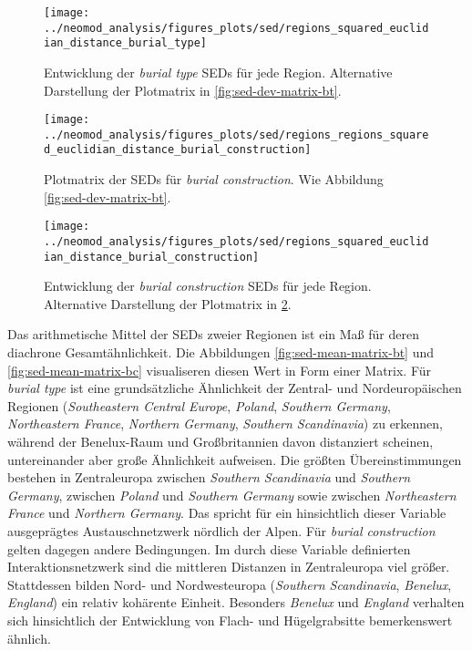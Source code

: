\documentclass[openany,twoside,twocolumn]{book}
\begin{document}
\begin{figure}
\texttt{[image: ../neomod\_analysis/figures\_plots/sed/regions\_squared\_euclidian\_distance\_burial\_type]} \caption[Entwicklung der \textit{burial type} SEDs für jede Region]{Entwicklung der \textit{burial type} SEDs für jede Region. Alternative Darstellung der Plotmatrix in \ref{fig:sed-dev-matrix-bt}.}\label{fig:sed-dev-bt}
\end{figure}

\begin{figure}
\texttt{[image: ../neomod\_analysis/figures\_plots/sed/regions\_regions\_squared\_euclidian\_distance\_burial\_construction]} \caption[Plotmatrix der SEDs für \textit{burial construction}]{Plotmatrix der SEDs für \textit{burial construction}. Wie Abbildung \ref{fig:sed-dev-matrix-bt}.}\label{fig:sed-dev-matrix-bc}
\end{figure}

\begin{figure}
\texttt{[image: ../neomod\_analysis/figures\_plots/sed/regions\_squared\_euclidian\_distance\_burial\_construction]} \caption[Entwicklung der \textit{burial construction} SEDs für jede Region]{Entwicklung der \textit{burial construction} SEDs für jede Region. Alternative Darstellung der Plotmatrix in \ref{fig:sed-dev-matrix-bc}.}\label{fig:sed-dev-bc}
\end{figure}

Das arithmetische Mittel der SEDs zweier Regionen ist ein Maß für deren
diachrone Gesamtähnlichkeit. Die Abbildungen
\ref{fig:sed-mean-matrix-bt} und \ref{fig:sed-mean-matrix-bc}
visualiseren diesen Wert in Form einer Matrix. Für \emph{burial type}
ist eine grundsätzliche Ähnlichkeit der Zentral- und Nordeuropäischen
Regionen (\emph{Southeastern Central Europe}, \emph{Poland},
\emph{Southern Germany}, \emph{Northeastern France}, \emph{Northern
Germany}, \emph{Southern Scandinavia}) zu erkennen, während der
Benelux-Raum und Großbritannien davon distanziert scheinen,
untereinander aber große Ähnlichkeit aufweisen. Die größten
Übereinstimmungen bestehen in Zentraleuropa zwischen \emph{Southern
Scandinavia} und \emph{Southern Germany}, zwischen \emph{Poland} und
\emph{Southern Germany} sowie zwischen \emph{Northeastern France} und
\emph{Northern Germany}. Das spricht für ein hinsichtlich dieser
Variable ausgeprägtes Austauschnetzwerk nördlich der Alpen. Für
\emph{burial construction} gelten dagegen andere Bedingungen. Im durch
diese Variable definierten Interaktionsnetzwerk sind die mittleren
Distanzen in Zentraleuropa viel größer. Stattdessen bilden Nord- und
Nordwesteuropa (\emph{Southern Scandinavia}, \emph{Benelux},
\emph{England}) ein relativ kohärente Einheit. Besonders \emph{Benelux}
und \emph{England} verhalten sich hinsichtlich der Entwicklung von
Flach- und Hügelgrabsitte bemerkenswert ähnlich.
\end{document}
